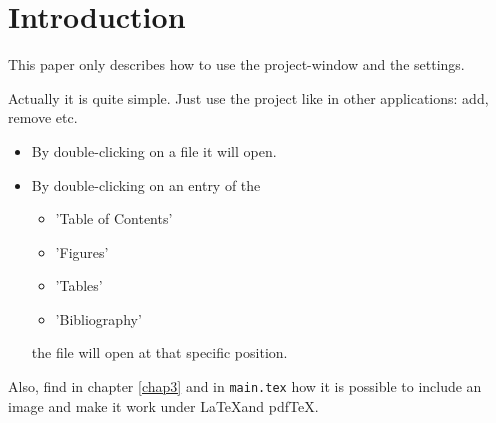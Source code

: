 \chapter{Introduction}
\thispagestyle{empty}

This paper only describes how to use the project-window
and the settings.

Actually it is quite simple. Just use the project like in
other applications: add, remove etc.

\begin{itemize}
\item {By double-clicking on a file it will open.}

\item {By double-clicking on an entry of the
\begin{itemize}
\item 'Table of Contents'
\item 'Figures'
\item 'Tables'
\item 'Bibliography'
\end{itemize}
the file will open at that specific position.}
\end{itemize}


Also, find in chapter \ref{chap3} and in {\tt main.tex}
how it is possible to include an image and make it work
under \LaTeX and pdf\TeX.

